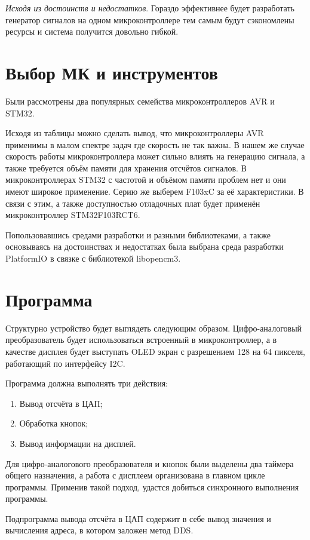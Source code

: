 \documentclass[a4paper, 14pt]{extarticle}
\begin{document}
	\textit{Исходя из достоинств и недостатков}. Гораздо эффективнее будет разработать генератор сигналов на одном микроконтроллере тем самым будут сэкономлены ресурсы и система получится довольно гибкой.
\section*{Выбор МК и инструментов}
	Были рассмотрены два популярных семейства микроконтроллеров AVR и STM32.
	
	Исходя из таблицы можно сделать вывод, что микроконтроллеры AVR применимы в малом спектре задач где скорость не так важна. В нашем же случае скорость работы микроконтроллера может сильно влиять на генерацию сигнала, а также требуется объём памяти для хранения отсчётов сигналов. В микроконтроллерах STM32 с частотой и объёмом памяти проблем нет и они имеют широкое применение. Серию же выберем F103xC за её характеристики. В связи с этим, а также доступностью отладочных плат будет применён микроконтроллер STM32F103RCT6.
	
	Попользовавшись средами разработки и разными библиотеками, а также основываясь на достоинствах и недостатках была выбрана среда разработки PlatformIO в связке с библиотекой libopencm3.
	
\section*{Программа}
	Структурно устройство будет выглядеть следующим образом. Цифро-аналоговый преобразователь будет использоваться встроенный в микроконтроллер, а в качестве дисплея будет выступать OLED экран с разрешением 128 на 64 пикселя, работающий по интерфейсу I2C.

	Программа должна выполнять три действия:
	
	\begin{enumerate}
		\item Вывод отсчёта в ЦАП;
		\item Обработка кнопок;
		\item Вывод информации на дисплей.
	\end{enumerate}
	
	
	Для цифро-аналогового преобразователя и кнопок были выделены два таймера общего назначения, а работа с дисплеем организована в главном цикле программы. Применив такой подход, удастся добиться синхронного выполнения программы. 
	
	Подпрограмма вывода отсчёта в ЦАП содержит в себе вывод значения и вычисления адреса, в котором заложен метод DDS.
	
\end{document}
